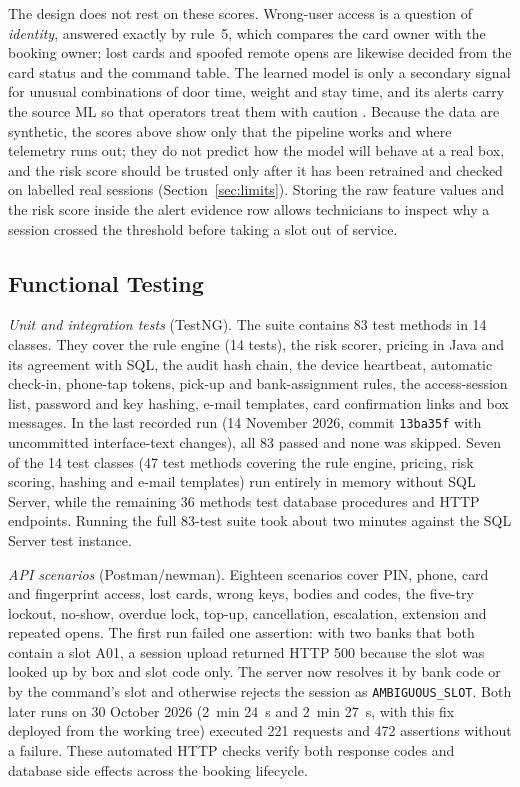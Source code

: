 \documentclass[journal,onecolumn]{IEEEtran}
\begin{document}
The design does not rest on these scores. Wrong-user access is a question of \emph{identity}, answered exactly by
rule~5, which compares the card owner with the booking owner; lost cards and spoofed remote opens are likewise decided
from the card status and the command table. The learned model is only a secondary signal for unusual combinations of
door time, weight and stay time, and its alerts carry the source ML so that operators treat them with caution
\cite{sommer2010outside}. Because the data are synthetic, the scores above show only that the pipeline works and where
telemetry runs out; they do not predict how the model will behave at a real box, and the risk score should be trusted
only after it has been retrained and checked on labelled real sessions (Section~\ref{sec:limits}). Storing the raw
feature values and the risk score inside the alert evidence row allows technicians to inspect why a session crossed the
threshold before taking a slot out of service.

\subsection{Functional Testing}
\label{sec:functional}

\textit{Unit and integration tests} (TestNG). The suite contains 83 test methods in 14 classes. They cover the rule
engine (14 tests), the risk scorer, pricing in Java and its agreement with SQL, the audit hash chain, the device
heartbeat, automatic check-in, phone-tap tokens, pick-up and bank-assignment rules, the access-session list, password
and key hashing, e-mail templates, card confirmation links and box messages. In the last recorded run (14 November
2026, commit \texttt{13ba35f} with uncommitted interface-text changes), all 83 passed and none was skipped. Seven of the 14 test classes (47 test methods covering the
rule engine, pricing, risk scoring, hashing and e-mail templates) run entirely in memory without SQL Server, while the
remaining 36 methods test database procedures and HTTP endpoints. Running the full 83-test suite took about two minutes
against the SQL Server test instance.

\textit{API scenarios} (Postman/newman). Eighteen scenarios cover PIN, phone, card and fingerprint access, lost cards,
wrong keys, bodies and codes, the five-try lockout, no-show, overdue lock, top-up, cancellation, escalation, extension
and repeated opens. The first run failed one assertion: with two banks that both contain a slot A01, a session upload
returned HTTP 500 because the slot was looked up by box and slot code only. The server now resolves it by bank code or
by the command's slot and otherwise rejects the session as \texttt{AMBIGUOUS\_SLOT}. Both later runs on 30 October
2026 (2~min 24~s and 2~min 27~s, with this fix deployed from the working tree) executed 221 requests and 472
assertions without a failure. These automated HTTP checks verify both
response codes and database side effects across the booking lifecycle.
\end{document}
